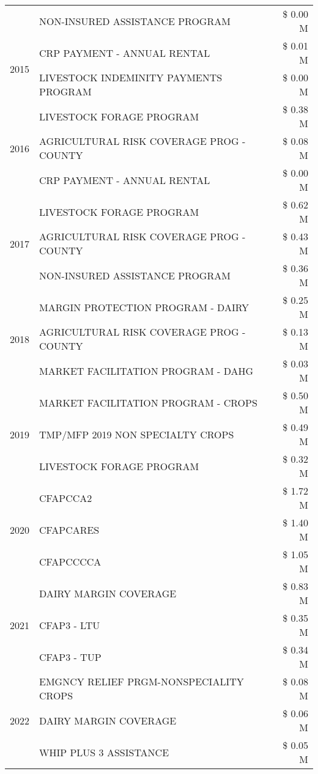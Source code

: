 \begin{tabular}{llr}
 & NON-INSURED ASSISTANCE PROGRAM & \$ 0.00 M \\
\cline{1-3}
\multirow[t]{2}{*}{2015} & CRP PAYMENT - ANNUAL RENTAL & \$ 0.01 M \\
 & LIVESTOCK INDEMINITY PAYMENTS PROGRAM & \$ 0.00 M \\
\cline{1-3}
\multirow[t]{3}{*}{2016} & LIVESTOCK FORAGE PROGRAM & \$ 0.38 M \\
 & AGRICULTURAL RISK COVERAGE PROG - COUNTY & \$ 0.08 M \\
 & CRP PAYMENT - ANNUAL RENTAL & \$ 0.00 M \\
\cline{1-3}
\multirow[t]{3}{*}{2017} & LIVESTOCK FORAGE PROGRAM & \$ 0.62 M \\
 & AGRICULTURAL RISK COVERAGE PROG - COUNTY & \$ 0.43 M \\
 & NON-INSURED ASSISTANCE PROGRAM & \$ 0.36 M \\
\cline{1-3}
\multirow[t]{3}{*}{2018} & MARGIN PROTECTION PROGRAM - DAIRY & \$ 0.25 M \\
 & AGRICULTURAL RISK COVERAGE PROG - COUNTY & \$ 0.13 M \\
 & MARKET FACILITATION PROGRAM - DAHG & \$ 0.03 M \\
\cline{1-3}
\multirow[t]{3}{*}{2019} & MARKET FACILITATION PROGRAM - CROPS & \$ 0.50 M \\
 & TMP/MFP 2019 NON SPECIALTY CROPS & \$ 0.49 M \\
 & LIVESTOCK FORAGE PROGRAM & \$ 0.32 M \\
\cline{1-3}
\multirow[t]{3}{*}{2020} & CFAPCCA2 & \$ 1.72 M \\
 & CFAPCARES & \$ 1.40 M \\
 & CFAPCCCCA & \$ 1.05 M \\
\cline{1-3}
\multirow[t]{3}{*}{2021} & DAIRY MARGIN COVERAGE & \$ 0.83 M \\
 & CFAP3 - LTU & \$ 0.35 M \\
 & CFAP3 - TUP & \$ 0.34 M \\
\cline{1-3}
\multirow[t]{3}{*}{2022} & EMGNCY RELIEF PRGM-NONSPECIALITY CROPS & \$ 0.08 M \\
 & DAIRY MARGIN COVERAGE & \$ 0.06 M \\
 & WHIP PLUS 3 ASSISTANCE & \$ 0.05 M \\
\cline{1-3}
\bottomrule
\end{tabular}

